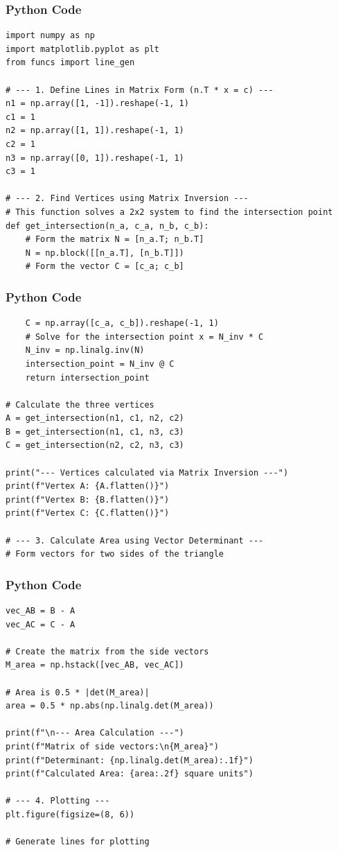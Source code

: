 \documentclass{beamer}
\begin{document}
\begin{frame}[fragile]
\frametitle{Python Code}
\begin{lstlisting}
import numpy as np
import matplotlib.pyplot as plt
from funcs import line_gen

# --- 1. Define Lines in Matrix Form (n.T * x = c) ---
n1 = np.array([1, -1]).reshape(-1, 1)
c1 = 1
n2 = np.array([1, 1]).reshape(-1, 1)
c2 = 1
n3 = np.array([0, 1]).reshape(-1, 1)
c3 = 1

# --- 2. Find Vertices using Matrix Inversion ---
# This function solves a 2x2 system to find the intersection point
def get_intersection(n_a, c_a, n_b, c_b):
    # Form the matrix N = [n_a.T; n_b.T]
    N = np.block([[n_a.T], [n_b.T]])
    # Form the vector C = [c_a; c_b]
    \end{lstlisting}    
\end{frame}
\begin{frame}[fragile]
\frametitle{Python Code}
\begin{lstlisting}
    C = np.array([c_a, c_b]).reshape(-1, 1)
    # Solve for the intersection point x = N_inv * C
    N_inv = np.linalg.inv(N)
    intersection_point = N_inv @ C
    return intersection_point

# Calculate the three vertices
A = get_intersection(n1, c1, n2, c2)
B = get_intersection(n1, c1, n3, c3)
C = get_intersection(n2, c2, n3, c3)

print("--- Vertices calculated via Matrix Inversion ---")
print(f"Vertex A: {A.flatten()}")
print(f"Vertex B: {B.flatten()}")
print(f"Vertex C: {C.flatten()}")

# --- 3. Calculate Area using Vector Determinant ---
# Form vectors for two sides of the triangle
\end{lstlisting}    
\end{frame}
\begin{frame}[fragile]
\frametitle{Python Code}
\begin{lstlisting}
vec_AB = B - A
vec_AC = C - A

# Create the matrix from the side vectors
M_area = np.hstack([vec_AB, vec_AC])

# Area is 0.5 * |det(M_area)|
area = 0.5 * np.abs(np.linalg.det(M_area))

print(f"\n--- Area Calculation ---")
print(f"Matrix of side vectors:\n{M_area}")
print(f"Determinant: {np.linalg.det(M_area):.1f}")
print(f"Calculated Area: {area:.2f} square units")

# --- 4. Plotting ---
plt.figure(figsize=(8, 6))

# Generate lines for plotting
\end{lstlisting}    
\end{frame}
\end{document}
